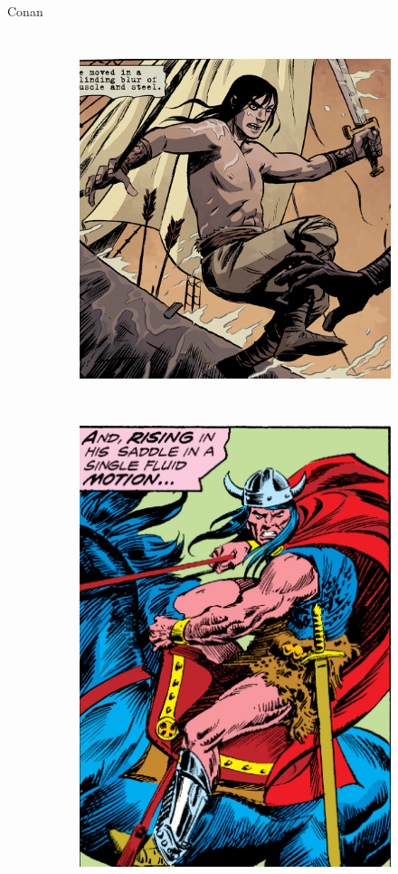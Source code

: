 \begin{frame}{Conan}
\begin{columns}
\begin{figure}[htp]
\begin{subfigure}[b]{0.27\textwidth}
				\includegraphics[width=\textwidth]{img/conan/DH}
			\end{subfigure}
			~
			\begin{subfigure}[b]{0.23\textwidth}
				\includegraphics[width=\textwidth]{img/conan/CTB}

\end{subfigure}
\end{figure}
\end{columns}
\end{frame}
